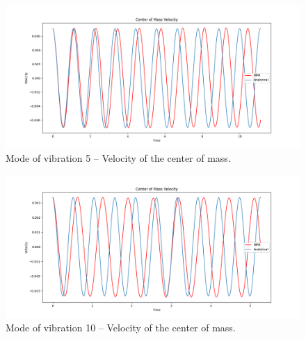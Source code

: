 \documentclass[preprint,12pt]{elsarticle}
\begin{document}
\begin{figure}
    	\includegraphics[width=\linewidth]{ModoVibracional5.png}
    	\caption{Mode of vibration 5 – Velocity of the center of mass.}
    	\centering
    \end{figure}

\begin{figure}
    	\includegraphics[width=\linewidth]{ModoVibracional10.png}
    	\caption{Mode of vibration 10 – Velocity of the center of mass.}
    	\centering
    \end{figure}
\end{document}
